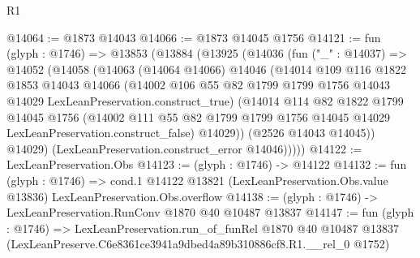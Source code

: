 \begin{lexlean}{R1}
\begin{coremodule}
@14064 := @1873 @14043
@14066 := @1873 @14045 @1756
@14121 := fun (glyph : @1746) =>
  @13853
    (@13884
      (@13925
        (@14036
          (fun ("_" : @14037) =>
          @14052
            (@14058
              (@14063
                (@14064 @14066)
                @14046
                (@14014
                  @109
                  @116
                  @1822
                  @1853
                  @14043
                  @14066
                  (@14002
                    @106
                    @55
                    @82
                    @1799
                    @1799
                    @1756
                    @14043
                    @14029
                    LexLeanPreservation.construct_true)
                  (@14014
                    @114
                    @82
                    @1822
                    @1799
                    @14045
                    @1756
                    (@14002
                      @111
                      @55
                      @82
                      @1799
                      @1799
                      @1756
                      @14045
                      @14029
                      LexLeanPreservation.construct_false)
                    @14029))
                (@2526 @14043 @14045))
              @14029)
            (LexLeanPreservation.construct_error @14046)))))
@14122 := LexLeanPreservation.Obs
@14123 := (glyph : @1746) -> @14122
@14132 := fun (glyph : @1746) =>
  cond.{1} @14122 @13821 (LexLeanPreservation.Obs.value @13836) LexLeanPreservation.Obs.overflow
@14138 := (glyph : @1746) -> LexLeanPreservation.RunConv @1870 @40 @10487 @13837
@14147 := fun (glyph : @1746) =>
  LexLeanPreservation.run_of_funRel
    @1870
    @40
    @10487
    @13837
    (LexLeanPreserve.C6e8361ce3941a9dbed4a89b310886cf8.R1.__rel_0 @1752)
\end{coremodule}
\end{lexlean}
